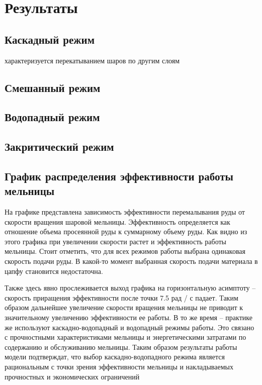 \documentclass[a4paper]{article}
\begin{document}
\section{Результаты}

\subsection{Каскадный режим}

характеризуется перекатыванием шаров по другим слоям

\subsection{Смешанный режим}

\subsection{Водопадный режим}


\subsection{Закритический режим}

\subsection{График распределения эффективности работы мельницы}

На графике представлена зависимость эффективности перемалывания руды от скорости вращения шаровой мельницы. 
Эффективность определяется как отношение объема просеянной руды к суммарному объему руды.
Как видно из этого графика при увеличении скорости растет и эффективность работы мельницы.
Стоит отметить, что для всех режимов работы выбрана одинаковая скорость подачи руды.
В какой-то момент выбранная скорость подачи материала в цапфу становится недостаточна.

Также здесь явно прослеживается выход графика на горизонтальную асимптоту -- скорость приращения эффективности после точки 7.5 рад / с падает. 
Таким образом дальнейшее увеличение скорости вращения мельницы не приводит к значительному увеличению эффективности ее работы. В то же время -- практике же используют каскадно-водопадный и водопадный режимы работы.
Это связано с прочностными характеристиками мельницы и энергетическими затратами по содержанию и обслуживанию мельницы.
Таким образом результаты работы модели подтверждат, что выбор каскадно-водопадного режима является рациональным с точки зрения эффективности мельницы и накладываемых прочностных и экономических ограничений
\end{document}
